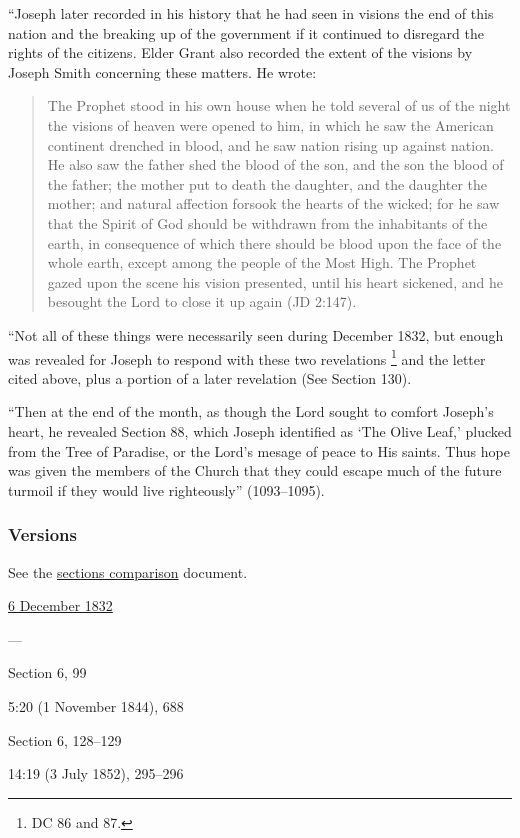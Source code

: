			``Joseph later recorded in his history that he had seen in visions the end of this nation and the breaking up of the government if it continued to disregard the rights of the citizens. Elder Grant also recorded the extent of the visions by Joseph Smith concerning these matters. He wrote: 
			
				\begin{quote}
					The Prophet stood in his own house when he told several of us of the night the visions of heaven were opened to him, in which he saw the American continent drenched in blood, and he saw nation rising up against nation. He also saw the father shed the blood of the son, and the son the blood of the father; the mother put to death the daughter, and the daughter the mother; and natural affection forsook the hearts of the wicked; for he saw that the Spirit of God should be withdrawn from the inhabitants of the earth, in consequence of which there should be blood upon the face of the whole earth, except among the people of the Most High. The Prophet gazed upon the scene his vision presented, until his heart sickened, and he besought the Lord to close it up again (JD 2:147).
				\end{quote}
				
			``Not all of these things were necessarily seen during December 1832, but enough was revealed for Joseph to respond with these two revelations%
				\footnote{%
					DC 86 and 87.
					}
			and the letter cited above, plus a portion of a later revelation (See Section 130).
			
			``Then at the end of the month, as though the Lord sought to comfort Joseph's heart, he revealed Section 88, which Joseph identified as `The Olive Leaf,' plucked from the Tree of Paradise, or the Lord's mesage of peace to His saints. Thus hope was given the members of the Church that they could escape much of the future turmoil if they would live righteously'' (1093--1095).
			
	\subsubsection{Versions}
		\label{DC86-V}
		
		See the \href{https://drive.google.com/file/d/1goAvNz8jS4R8slYfMG_db55Ty2z_vmgK/view?usp=sharing}{sections comparison} document.
	
		\begin{compactdesc}
			\item[JSP] \hyperref[EMS-1832-JS-6-DEC-1832]{6 December 1832}
			\item[BC] ---
			\item[DC 1835] Section 6, 99
			\item[TS] 5:20 (1 November 1844), 688
			\item[DC 1844] Section 6, 128--129
			\item[MS] 14:19 (3 July 1852), 295--296
		\end{compactdesc}

